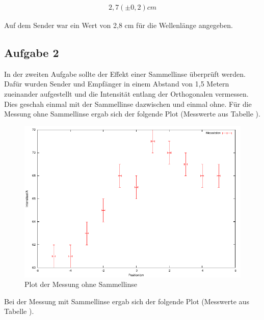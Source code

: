 \documentclass[12pt]{scrartcl}
\begin{document}
\begin{align*}
2,7 (\pm 0,2) cm
\end{align*}


Auf dem Sender war ein Wert von 2,8 cm für die Wellenlänge angegeben.

\subsection{Aufgabe 2}
In der zweiten Aufgabe sollte der Effekt einer Sammellinse überprüft werden.
Dafür wurden Sender und Empfänger in einem Abstand von 1,5 Metern zueinander aufgestellt und die Intensität entlang der Orthogonalen vermessen. Dies geschah einmal mit der Sammellinse dazwischen und einmal ohne. Für die Messung ohne Sammellinse ergab sich der folgende Plot (Messwerte aus Tabelle %
).

\begin{figure}[H]
\centering
    \includegraphics[scale = 1]{a_2_o.pdf}
  	\caption[Plot der Messung ohne Sammellinse]{Plot der Messung ohne Sammellinse}
  \label{fig:a_2_o}
\end{figure}

Bei der Messung mit Sammellinse ergab sich der folgende Plot (Messwerte aus Tabelle 
).
\end{document}
